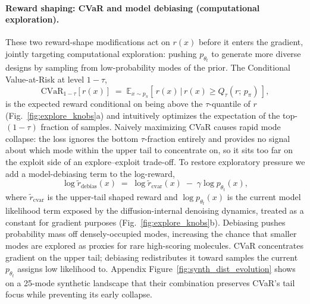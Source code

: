 \documentclass{article}
\begin{document}
\paragraph{Reward shaping: CVaR and model debiasing (computational exploration).} These two reward-shape modifications act on $r(x)$ before it enters the gradient, jointly targeting computational exploration: pushing $p_{\theta_t}$ to generate more diverse designs by sampling from low-probability modes of the prior. The Conditional Value-at-Risk at level $1-\tau$,
\begin{equation}
\mathrm{CVaR}_{1-\tau}\!\left[r(x)\right] \;=\; \mathbb{E}_{x \sim p_\pi}\!\left[\,r(x) \,\Big|\, r(x) \geq Q_\tau(r;\, p_\pi)\,\right],
\label{eq:cvar}
\end{equation}
is the expected reward conditional on being above the $\tau$-quantile of $r$ (Fig.~\ref{fig:explore_knobs}a) and intuitively optimizes the expectation of the top-$(1-\tau)$ fraction of samples. Naively maximizing CVaR causes rapid mode collapse: the loss ignores the bottom $\tau$-fraction entirely and provides no signal about which mode within the upper tail to concentrate on, so it sits too far on the exploit side of an explore--exploit trade-off. To restore exploratory pressure we add a model-debiasing term to the log-reward,
\begin{equation}
\log \tilde r_{\text{debias}}(x) \;=\; \log \tilde r_{\text{cvar}}(x) \;-\; \gamma \log p_{\theta_t}(x),
\label{eq:debias}
\end{equation}
where $\tilde r_{\text{cvar}}$ is the upper-tail shaped reward and $\log p_{\theta_t}(x)$ is the current model likelihood term exposed by the diffusion-internal denoising dynamics, treated as a constant for gradient purposes (Fig.~\ref{fig:explore_knobs}b). Debiasing pushes probability mass off densely-occupied modes, increasing the chance that smaller modes are explored as proxies for rare high-scoring molecules. CVaR concentrates gradient on the upper tail; debiasing redistributes it toward samples the current $p_{\theta_t}$ assigns low likelihood to. Appendix Figure~\ref{fig:synth_dist_evolution} shows on a 25-mode synthetic landscape that their combination preserves CVaR's tail focus while preventing its early collapse.
\end{document}
